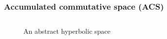 \documentclass[aspectratio=169]{beamer}
\begin{document}
\begin{frame}
    \frametitle{Accumulated commutative space (ACS)}
    \begin{columns}
        \begin{column}{0.4\textwidth}
            \begin{figure}[ht]\centering
            \caption{An abstract hyperbolic space}
            \end{figure}
        \end{column}
        \begin{column}{0.6\textwidth}
            \begin{figure}[ht]\centering

\end{figure}
\end{column}
\end{columns}
\end{frame}
\end{document}
